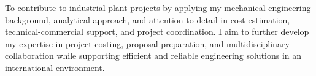 
\begin{cventries}

    To contribute to industrial plant projects by applying my mechanical 
    engineering background, analytical approach, and attention to detail 
    in cost estimation, technical-commercial support, and project coordination. 
    I aim to further develop my expertise in project costing, proposal preparation, 
    and multidisciplinary collaboration while supporting efficient and reliable 
    engineering solutions in an international environment.

\end{cventries}